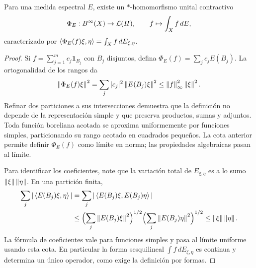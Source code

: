 \begin{proposicion}\label{v3:integral-espectral}
Para una medida espectral $E$, existe un $*$-homomorfismo unital contractivo
\[
 \Phi_E:B^\infty(X)\to\mathcal L(H),\qquad f\mapsto\int_Xf\,dE,
\]
caracterizado por
$\left\langle\Phi_E(f)\xi,\eta\right\rangle=\int_X f\,dE_{\xi,\eta}$.
\end{proposicion}
\begin{proof}
Si $f=\sum_{j=1}^mc_j\mathbf1_{B_j}$ con $B_j$ disjuntos, defina $\Phi_E(f)=\sum_jc_jE(B_j)$. La ortogonalidad de los rangos da
\[
 \left\lVert\Phi_E(f)\xi\right\rVert^2=\sum_j|c_j|^2\left\lVert E(B_j)\xi\right\rVert^2
 \le\left\lVert f\right\rVert_\infty^2\left\lVert\xi\right\rVert^2.
\]
Refinar dos particiones a sus intersecciones demuestra que la definición no depende de la representación simple y que preserva productos, sumas y adjuntos. Toda función boreliana acotada se aproxima uniformemente por funciones simples, particionando su rango acotado en cuadrados pequeños. La cota anterior permite definir $\Phi_E(f)$ como límite en norma; las propiedades algebraicas pasan al límite.

Para identificar los coeficientes, note que la variación total de $E_{\xi,\eta}$ es a lo sumo $\left\lVert\xi\right\rVert\left\lVert\eta\right\rVert$. En una partición finita,
\begin{align*}
 \sum_j|\left\langle E(B_j)\xi,\eta\right\rangle|
 &=\sum_j|\left\langle E(B_j)\xi,E(B_j)\eta\right\rangle|\\
 &\le\Bigl(\sum_j\left\lVert E(B_j)\xi\right\rVert^2\Bigr)^{1/2}
 \Bigl(\sum_j\left\lVert E(B_j)\eta\right\rVert^2\Bigr)^{1/2}
 \le\left\lVert\xi\right\rVert\left\lVert\eta\right\rVert.
\end{align*}
La fórmula de coeficientes vale para funciones simples y pasa al límite uniforme usando esta cota. En particular la forma sesquilineal $\int f\,dE_{\xi,\eta}$ es continua y determina un único operador, como exige la definición por formas.
\end{proof}

